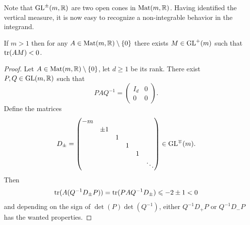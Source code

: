 \documentclass[english]{article}
\begin{document}
%
    Note that $\operatorname{GL}^\pm(m, \mathbb{R})$ are two open cones in $\operatorname{Mat}(m, \mathbb{R})$.
    Having identified the vertical measure, it is now easy to recognize a non-integrable behavior in the integrand. 
\begin{lemma}\label{lmno:NegativetrAM}
	If $m>1$ then for any $A\in \operatorname{Mat}(m, \mathbb{R}) \setminus\{0\}$ there exists $M\in \operatorname{GL}^+(m)$ such that $\operatorname{tr}(AM)<0$.
\end{lemma}
\begin{proof}
	Let $A\in \operatorname{Mat}(m, \mathbb{R}) \setminus\{0\}$, let $d\geqslant 1$ be its rank. There exist $P,Q\in \operatorname{GL}(m, \mathbb{R})$ such that
	\[
		P A Q^{-1} = 
		\begin{pmatrix}
		I_d & 0 \\
		0 & 0
		\end{pmatrix}
	.\]
	Define the matrices
	\[
		D_\pm =
		\begin{pmatrix}
			-m &  &  &  &  &  \\
			   &\pm1&  &  &  &  \\
			   &  & 1&  &  &  \\
			   &  &  & 1&  &  \\
			   &  &  &  & 1&  \\
			   &  &  &  &  & \ddots 
		\end{pmatrix}
		\in \operatorname{GL}^{\mp}(m)
	.\]
	Then 
	\[
		\operatorname{tr}(A (Q^{-1}D_\pm P))
		= \operatorname{tr}(PAQ^{-1} D_\pm)
		\leqslant -2 \pm 1 < 0
	\]
	and depending on the sign of $\det(P)\det(Q^{-1})$, either $Q^{-1} D_+ P$ or $Q^{-1} D_- P$ has the wanted properties.
\end{proof}
\end{document}

